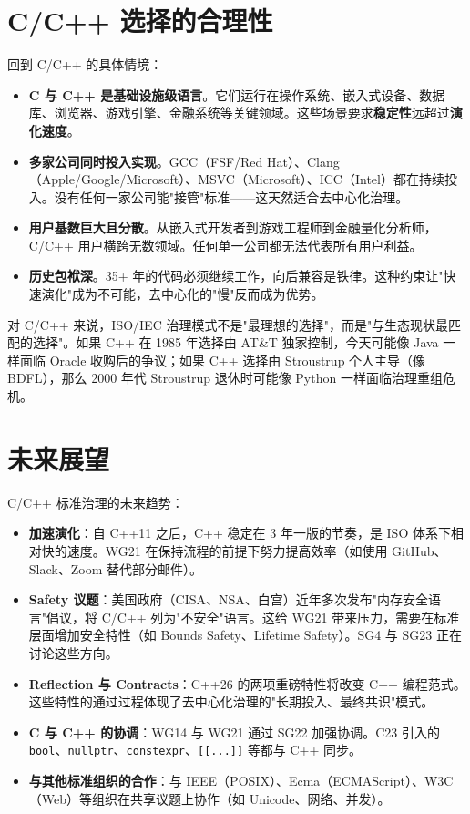 \documentclass[12pt,a4paper,fontset=fandol]{ctexbook}
\newcommand{\kw}[1]{\texttt{#1}}
\begin{document}
\section{C/C++ 选择的合理性}

回到 C/C++ 的具体情境：

\begin{itemize}
  \item \textbf{C 与 C++ 是基础设施级语言}。它们运行在操作系统、嵌入式设备、数据库、浏览器、游戏引擎、金融系统等关键领域。这些场景要求\textbf{稳定性}远超过\textbf{演化速度}。
  \item \textbf{多家公司同时投入实现}。GCC（FSF/Red Hat）、Clang（Apple/Google/Microsoft）、MSVC（Microsoft）、ICC（Intel）都在持续投入。没有任何一家公司能"接管"标准——这天然适合去中心化治理。
  \item \textbf{用户基数巨大且分散}。从嵌入式开发者到游戏工程师到金融量化分析师，C/C++ 用户横跨无数领域。任何单一公司都无法代表所有用户利益。
  \item \textbf{历史包袱深}。35+ 年的代码必须继续工作，向后兼容是铁律。这种约束让"快速演化"成为不可能，去中心化的"慢"反而成为优势。
\end{itemize}

对 C/C++ 来说，ISO/IEC 治理模式不是"最理想的选择"，而是"与生态现状最匹配的选择"。如果 C++ 在 1985 年选择由 AT\&T 独家控制，今天可能像 Java 一样面临 Oracle 收购后的争议；如果 C++ 选择由 Stroustrup 个人主导（像 BDFL），那么 2000 年代 Stroustrup 退休时可能像 Python 一样面临治理重组危机。

\section{未来展望}

C/C++ 标准治理的未来趋势：

\begin{itemize}
  \item \textbf{加速演化}：自 C++11 之后，C++ 稳定在 3 年一版的节奏，是 ISO 体系下相对快的速度。WG21 在保持流程的前提下努力提高效率（如使用 GitHub、Slack、Zoom 替代部分邮件）。
  \item \textbf{Safety 议题}：美国政府（CISA、NSA、白宫）近年多次发布"内存安全语言"倡议，将 C/C++ 列为"不安全"语言。这给 WG21 带来压力，需要在标准层面增加安全特性（如 Bounds Safety、Lifetime Safety）。SG4 与 SG23 正在讨论这些方向。
  \item \textbf{Reflection 与 Contracts}：C++26 的两项重磅特性将改变 C++ 编程范式。这些特性的通过过程体现了去中心化治理的"长期投入、最终共识"模式。
  \item \textbf{C 与 C++ 的协调}：WG14 与 WG21 通过 SG22 加强协调。C23 引入的 \kw{bool}、\kw{nullptr}、\kw{constexpr}、\kw{[[...]]} 等都与 C++ 同步。
  \item \textbf{与其他标准组织的合作}：与 IEEE（POSIX）、Ecma（ECMAScript）、W3C（Web）等组织在共享议题上协作（如 Unicode、网络、并发）。
\end{itemize}
\end{document}
